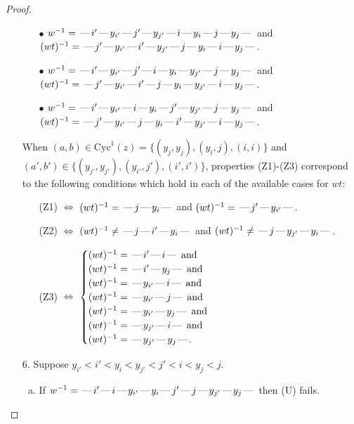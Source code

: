 \documentclass[10pt]{article}
\theoremstyle{definition}
\theoremstyle{definition}
\def\dash{\text{\hspace{0.5mm}---\hspace{0.5mm}}}
\def\Cyc{\mathrm{Cyc}}
\begin{document}
\begin{proof}
\begin{enumerate}
\begin{enumerate}
\item[$\bullet$] $w^{-1} = \dash i'\dash y_{i'}\dash j'\dash y_{j'}\dash i\dash y_i\dash j\dash y_j\dash $ and $(wt)^{-1} = \dash j'\dash y_{i'}\dash i'\dash y_{j'}\dash j\dash y_i\dash i\dash y_j\dash $.
\item[$\bullet$] $w^{-1} = \dash i'\dash y_{i'}\dash j'\dash i\dash y_i\dash y_{j'}\dash j\dash y_j\dash $ and $(wt)^{-1} = \dash j'\dash y_{i'}\dash i'\dash j\dash y_i\dash y_{j'}\dash i\dash y_j\dash $.
\item[$\bullet$] $w^{-1} = \dash i'\dash y_{i'}\dash i\dash y_i\dash j'\dash y_{j'}\dash j\dash y_j\dash $ and $(wt)^{-1} = \dash j'\dash y_{i'}\dash j\dash y_i\dash i'\dash y_{j'}\dash i\dash y_j\dash $.
\end{enumerate}
When $(a,b)\in\Cyc^1(z)=\{(y_j,y_j),(y_i,j),(i,i)\}$ and $(a',b')\in\{(y_{j'},y_{j'}),(y_{i'},j'),(i',i')\}$,
properties (Z1)-(Z3) correspond to the following conditions which
hold in each of the available cases for $wt$:
\begin{enumerate}
\item[](Z1) $\Leftrightarrow$ $(wt)^{-1} = \dash j \dash y_i \dash$  and $(wt)^{-1} = \dash j' \dash y_{i'} \dash$.
\item[](Z2) $\Leftrightarrow$ $(wt)^{-1} \neq \dash j \dash i' \dash y_i \dash$  and $(wt)^{-1} \neq \dash j \dash y_{j'} \dash y_i \dash$.
\item[](Z3) $\Leftrightarrow$ $\begin{cases}\text{$(wt)^{-1} = \dash i' \dash i \dash$}\text{ and }\\
\text{$(wt)^{-1} = \dash i' \dash y_j \dash$}\text{ and }\\
\text{$(wt)^{-1} = \dash y_{i'} \dash i \dash$}\text{ and }\\
\text{$(wt)^{-1} = \dash y_{i'} \dash j \dash$}\text{ and }\\
\text{$(wt)^{-1} = \dash y_{i'} \dash y_j \dash$}\text{ and }\\
\text{$(wt)^{-1} = \dash y_{j'} \dash i \dash$}\text{ and }\\
\text{$(wt)^{-1} = \dash y_{j'} \dash y_j \dash$}.\end{cases}$
\end{enumerate}
\item[$6$.] Suppose $y_{i'} < i' < y_i < y_{j'} < j' < i < y_j < j$.
\begin{enumerate}[(a)]
\item If $w^{-1} = \dash i'\dash i\dash y_{i'}\dash y_i\dash j'\dash j\dash y_{j'}\dash y_j\dash $ then (U) fails.

\end{enumerate}
\end{enumerate}
\end{proof}
\end{document}
